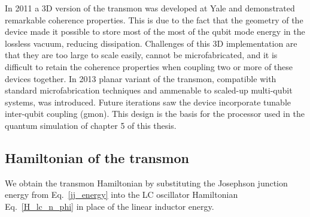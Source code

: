 In 2011 a 3D version of the transmon was developed at Yale and demonstrated remarkable coherence properties.\cite{Paik2011}
This is due to the fact that the geometry of the device made it possible to store most of the most of the qubit mode energy in the lossless vacuum, reducing dissipation.
Challenges of this 3D implementation are that they are too large to scale easily, cannot be microfabricated,
and it is difficult to retain the coherence properties when coupling two or more of these devices together.
In 2013 planar variant of the transmon,
compatible with standard microfabrication techniques and ammenable to scaled-up multi-qubit systems, was introduced.\cite{Barends2013}
Future iterations saw the device incorporate tunable inter-qubit coupling (gmon).\cite{Chen2014}
This design is the basis for the processor used in the quantum simulation of chapter 5 of this thesis.


\subsection{Hamiltonian of the transmon}

We obtain the transmon Hamiltonian by substituting the Josephson junction energy from Eq.~\ref{jj_energy} into the LC oscillator Hamiltonian
Eq.~\ref{H_lc_n_phi} in place of the linear inductor energy.

